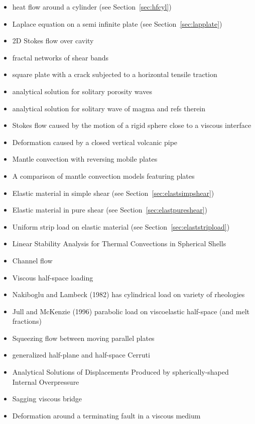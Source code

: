 \begin{itemize}
\item heat flow around a cylinder (see Section~\ref{sec:hfcyl})
\item Laplace equation on a semi infinite plate (see Section~\ref{sec:lapplate})
\item 2D Stokes flow over cavity \cite{poma14}
\item fractal networks of  shear bands \cite{pohe94}
\item square plate with a crack subjected to a horizontal tensile traction \cite{litu02}
\item analytical solution for solitary porosity waves \cite{copo15}
\item analytical solution for solitary wave of magma \cite{dahe16} and refs therein
\item Stokes flow caused by the motion of a rigid sphere close to a viscous interface \cite{dagr98}
\item Deformation caused by a closed vertical volcanic pipe \cite{boda99}
\item Mantle convection with reversing mobile plates \cite{kogk05}
\item A comparison of mantle convection models featuring plates \cite{stlh14}
\item Elastic material in simple shear (see Section~\ref{sec:elastsimpshear})
\item Elastic material in pure shear (see Section~\ref{sec:elastpureshear})
\item Uniform strip load on elastic material (see Section~\ref{sec:elaststripload})
\item Linear Stability Analysis for Thermal Convections in Spherical Shells \cite{yuwa19}
\item Channel flow \cite{manc08}
\item Viscous half-space loading \cite{hask35}
\item Nakiboglu and Lambeck (1982) has cylindrical load on variety of rheologies \cite{nala82}
\item Jull and McKenzie (1996) \cite{jumc96} parabolic load on viscoelastic half-space (and melt fractions) 
\item Squeezing flow between moving parallel plates \cite{gugu77}
\item generalized half-plane and half-space Cerruti \cite{nowi92,zhga15}
\item Analytical Solutions of Displacements Produced by spherically-shaped Internal Overpressure \cite{gech12}
\item Sagging viscous bridge \cite{stokes98}
\item Deformation around a terminating fault in a viscous medium \cite{baho96}
\end{itemize}


